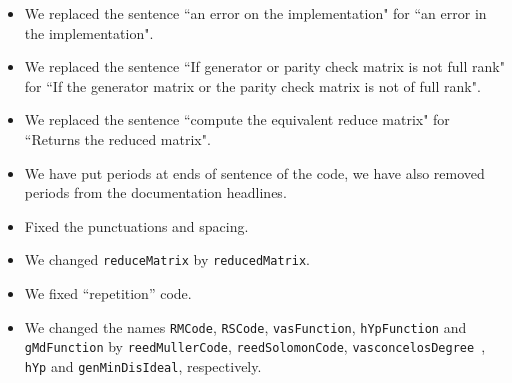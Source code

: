 \documentclass[12pt]{amsart}
\theoremstyle{plain}
\begin{document}
\begin{itemize}
\item We replaced the sentence ``an error on the implementation" for ``an error in the implementation".
\item We replaced the sentence ``If generator or parity check matrix is not full rank" for ``If the generator matrix or the parity check matrix is not of full rank".
\item We replaced the sentence ``compute the equivalent reduce matrix" for ``Returns the reduced matrix".
\item We have put periods at ends of sentence of the code, we have also removed periods from the documentation headlines.
\item Fixed the punctuations and spacing.
\item We changed {\tt reduceMatrix} by {\tt reducedMatrix}.
\item We fixed ``repetition'' code.
\item We changed the names {\tt RMCode}, {\tt RSCode}, {\tt vasFunction}, {\tt hYpFunction} and {\tt gMdFunction} by {\tt reedMullerCode}, {\tt reedSolomonCode}, {\tt vasconcelosDegree }, {\tt hYp} and {\tt genMinDisIdeal}, respectively.
\end{itemize}
\end{document}
